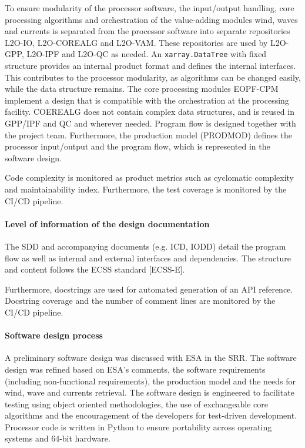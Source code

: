 To ensure modularity of the processor software, the input/output handling, core processing algorithms and orchestration of the value-adding modules wind, waves and currents is separated from the processor software into separate repositories L2O-IO, L2O-COREALG and L2O-VAM. These repositories are used by L2O-GPP, L2O-IPF and L2O-QC as needed. An \texttt{xarray.DataTree} with fixed structure provides an internal product format and defines the internal interfaces. This contributes to the processor modularity, as algorithms can be changed easily, while the data structure remains. The core processing modules EOPF-CPM implement a design that is compatible with the orchestration at the processing facility. COEREALG does not contain complex data structures, and is reused in GPP/IPF and QC and wherever needed. Program flow is designed together with the project team. Furthermore, the production model (PRODMOD) defines the processor input/output and the program flow, which is represented in the software design.

Code complexity is monitored as product metrics such as cyclomatic complexity and maintainability index. Furthermore, the test coverage is monitored by the CI/CD pipeline.

\paragraph*{Level of information of the design documentation}

The SDD and accompanying documents (e.g. ICD, IODD) detail the program flow as well as internal and external interfaces and dependencies. The structure and content follows the ECSS standard [ECSS-E].

Furthermore, docstrings are used for automated generation of an API reference. Docstring coverage and the number of comment lines are monitored by the CI/CD pipeline.

\paragraph*{Software design process}

A preliminary software design was discussed with ESA in the SRR. The software design was refined based on ESA's comments, the software requirements (including non-functional requirements), the production model and the needs for wind, wave and currents retrieval. The software design is engineered to facilitate testing using object oriented methodologies, the use of exchangeable core algorithms and the encouragement of the developers for test-driven development. Processor code is written in Python to ensure portability across operating systems and 64-bit hardware.

